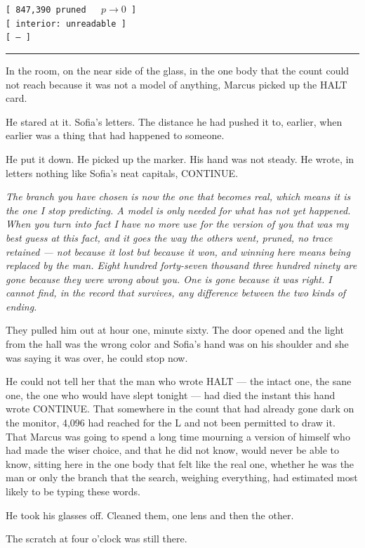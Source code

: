 \begin{center}
\texttt{[ 847,390 pruned \ \ $p \to 0$ ]}\\
\texttt{[ interior: unreadable ]}\\
\texttt{[ --- ]}
\end{center}

\begin{center}\rule{0.3\linewidth}{0.4pt}\end{center}

In the room, on the near side of the glass, in the one body that the count could not reach because it was not a model of anything, Marcus picked up the HALT card.

He stared at it. Sofia's letters. The distance he had pushed it to, earlier, when earlier was a thing that had happened to someone.

He put it down. He picked up the marker. His hand was not steady. He wrote, in letters nothing like Sofia's neat capitals, CONTINUE.

\emph{The branch you have chosen is now the one that becomes real, which means it is the one I stop predicting. A model is only needed for what has not yet happened. When you turn into fact I have no more use for the version of you that was my best guess at this fact, and it goes the way the others went, pruned, no trace retained --- not because it lost but because it won, and winning here means being replaced by the man. Eight hundred forty-seven thousand three hundred ninety are gone because they were wrong about you. One is gone because it was right. I cannot find, in the record that survives, any difference between the two kinds of ending.}

They pulled him out at hour one, minute sixty. The door opened and the light from the hall was the wrong color and Sofia's hand was on his shoulder and she was saying it was over, he could stop now.

He could not tell her that the man who wrote HALT --- the intact one, the sane one, the one who would have slept tonight --- had died the instant this hand wrote CONTINUE. That somewhere in the count that had already gone dark on the monitor, 4,096 had reached for the L and not been permitted to draw it. That Marcus was going to spend a long time mourning a version of himself who had made the wiser choice, and that he did not know, would never be able to know, sitting here in the one body that felt like the real one, whether he was the man or only the branch that the search, weighing everything, had estimated most likely to be typing these words.

He took his glasses off. Cleaned them, one lens and then the other.

The scratch at four o'clock was still there.
